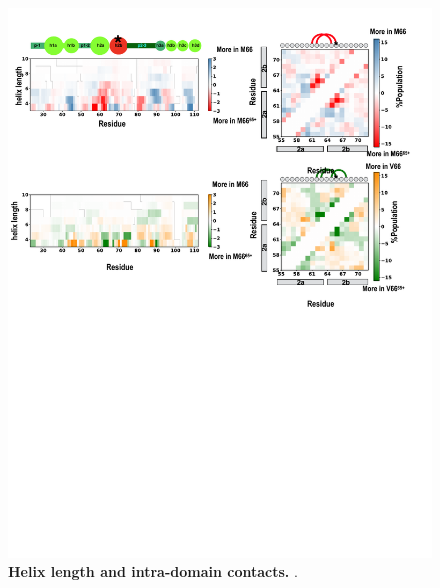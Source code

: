 \documentclass[journal=jacsat,manuscript=article]{achemso}
\begin{document}
\begin{figure}[!ht]
 \includegraphics[scale=0.5,width=\textwidth,trim={0 0cm 0 0},clip]{../figures/S8.pdf}
\caption{{\bf Helix length and intra-domain contacts.}
.
 }
\label{S8} 
\end{figure}
\end{document}
